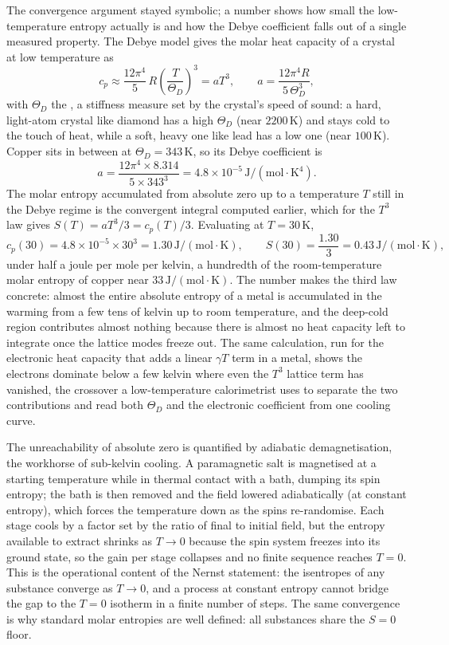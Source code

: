 The convergence argument stayed symbolic; a number shows how small the
low-temperature entropy actually is and how the Debye coefficient falls out of a
single measured property. The Debye model gives the molar heat capacity of a
crystal at low temperature as
\[
c_p \approx \frac{12\pi^4}{5}\,R\left(\frac{T}{\Theta_D}\right)^3 = a T^3,
\qquad
a = \frac{12\pi^4 R}{5\,\Theta_D^3},
\]
with $\Theta_D$ the , a stiffness measure set by the
crystal's speed of sound: a hard, light-atom crystal like diamond has a high
$\Theta_D$ (near $2200\,\si{\kelvin}$) and stays cold to the touch of heat, while
a soft, heavy one like lead has a low one (near $100\,\si{\kelvin}$). Copper sits
in between at $\Theta_D = 343\,\si{\kelvin}$, so its Debye coefficient is
\[
a = \frac{12\pi^4 \times 8.314}{5 \times 343^3} =
4.8\times 10^{-5}\,\text{J}/(\text{mol}\cdot\si{\kelvin}^4).
\]
The molar entropy accumulated from absolute zero up to a temperature $T$ still in
the Debye regime is the convergent integral computed earlier, which for the $T^3$
law gives $S(T) = a T^3/3 = c_p(T)/3$. Evaluating at $T = 30\,\si{\kelvin}$,
\[
c_p(30) = 4.8\times 10^{-5} \times 30^3 = 1.30\,\text{J}/(\text{mol}\cdot
\si{\kelvin}),
\qquad
S(30) = \frac{1.30}{3} = 0.43\,\text{J}/(\text{mol}\cdot\si{\kelvin}),
\]
under half a joule per mole per kelvin, a hundredth of the room-temperature molar
entropy of copper near $33\,\text{J}/(\text{mol}\cdot\si{\kelvin})$. The number
makes the third law concrete: almost the entire absolute entropy of a metal is
accumulated in the warming from a few tens of kelvin up to room temperature, and
the deep-cold region contributes almost nothing because there is almost no heat
capacity left to integrate once the lattice modes freeze out. The same
calculation, run for the electronic heat capacity that adds a linear $\gamma T$
term in a metal, shows the electrons dominate below a few kelvin where even the
$T^3$ lattice term has vanished, the crossover a low-temperature calorimetrist
uses to separate the two contributions and read both $\Theta_D$ and the electronic
coefficient from one cooling curve.

\begin{mastery}
The unreachability of absolute zero is quantified by adiabatic
demagnetisation, the workhorse of sub-kelvin cooling. A paramagnetic
salt is magnetised at a starting temperature while in thermal contact
with a bath, dumping its spin entropy; the bath is then removed and the
field lowered adiabatically (at constant entropy), which forces the
temperature down as the spins re-randomise. Each stage cools by a
factor set by the ratio of final to initial field, but the entropy
available to extract shrinks as $T \to 0$ because the spin system
freezes into its ground state, so the gain per stage collapses and no
finite sequence reaches $T = 0$. This is the operational content of the
Nernst statement: the isentropes of any substance converge as
$T \to 0$, and a process at constant entropy cannot bridge the gap to
the $T = 0$ isotherm in a finite number of steps. The same convergence
is why standard molar entropies are well defined: all substances share
the $S = 0$ floor.
\end{mastery}

